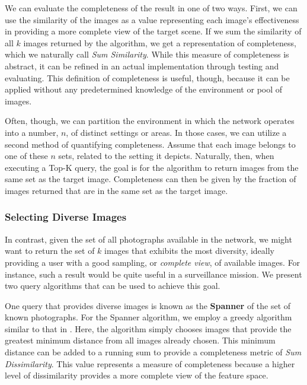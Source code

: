 We can evaluate the completeness of the result in one of two ways.  First, we can use the similarity of the images as a value representing each image's effectiveness in providing a more complete view of the target scene.  If we sum the similarity of all $k$ images returned by the algorithm, we get a representation of completeness, which we naturally call \emph{Sum Similarity}.  While this measure of completeness is abstract, it can be refined in an actual implementation through testing and evaluating.  This definition of completeness is useful, though, because it can be applied without any predetermined knowledge of the environment or pool of images.  

Often, though, we can partition the environment in which the network operates into a number, $n$, of distinct settings or areas.  In those cases, we can utilize a second method of quantifying completeness.  Assume that each image belongs to one of these $n$ sets, %
related to the setting it depicts.  Naturally, then, when executing a Top-K query, the goal is for the algorithm to return images from the same set as the target image.  Completeness can then be given by the fraction of images returned that are in the same set as the target image.

\subsubsection{Selecting Diverse Images}

In contrast, given the set of all photographs available in the network, we might want to return the set of $k$ images that exhibits the most diversity, ideally providing a user with a good sampling, or \emph{complete view}, of available images.  For instance, such a result would be quite useful in a surveillance mission.  We present two query algorithms that can be used to achieve this goal.

One query that provides diverse images is known as the {\bf Spanner} of the set of known photographs.  For the Spanner algorithm, we employ a greedy algorithm similar to that in \cite{mediascope}.  Here, the algorithm simply chooses images that provide the greatest minimum distance from all images already chosen.  This minimum distance can be added to a running sum to provide a completeness metric of \emph{Sum Dissimilarity}.  This value represents a measure of completeness because a higher level of dissimilarity provides a more complete view of the feature space.


